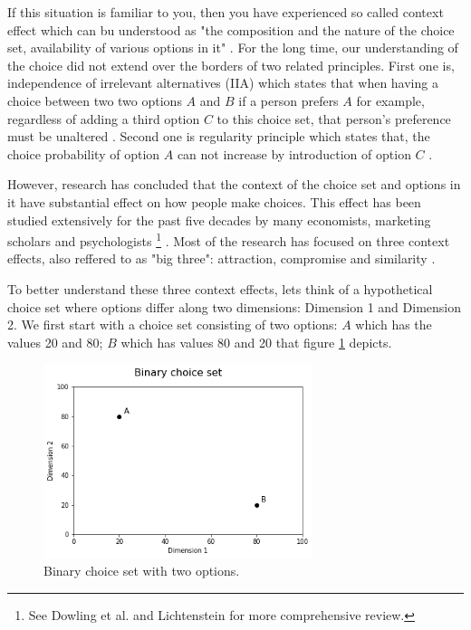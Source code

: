 \documentclass[a4paper,12pt]{article}
\newcommand{\citeyearonly}[1]{\citeyearpar{#1}}
\begin{document}
If this situation is familiar to you, then you have experienced so called context effect which can bu understood as "the composition  and the nature of the choice set, availability of various options in it" \citep{tversky1972elimination, huberPuto83}. For the long time, our understanding of the choice did not extend over the borders of two related principles. First one is, independence of irrelevant alternatives (IIA) which states that when having a choice between two two options $A$ and $B$ if a person prefers $A$ for example, regardless of adding a third option $C$ to this choice set, that person's preference must be unaltered \citep{luce59}. Second one is regularity principle which states that, the choice probability of option $A$ can not increase by introduction of option $C$ \citep{luce59}.

However, research has concluded that the context of the choice set and options in it have substantial effect on how people make choices. This effect has been studied extensively for the past five decades by many economists, marketing scholars and psychologists \footnote{See Dowling et al. \citeyearonly{dowlingEtAl20} and Lichtenstein \citeyearonly{lichtenstein2006construction} for more comprehensive review.} \citep{tverskySimonson93, kahnemanTversky79, simonson89, lichtenstein2006construction, dowlingEtAl20}. Most of the research has focused on three context effects, also reffered to as "big three": attraction, compromise and similarity \citep{howes2016contextual}.

To better understand these three context effects, lets think of a hypothetical choice set where options differ along two dimensions: Dimension 1 and Dimension 2. We first start with a choice set consisting of two options: $A$ which has the values 20 and 80; $B$ which has values 80 and 20 that figure \ref{fig:binaryChoiseSet} depicts. 

\begin{figure}[h]
    \centering
    \includegraphics[width=0.7\textwidth]{staticFiles/noEffect.png}
    \caption{Binary choice set with two options.} %
    \label{fig:binaryChoiseSet} %

\end{figure}
\end{document}
